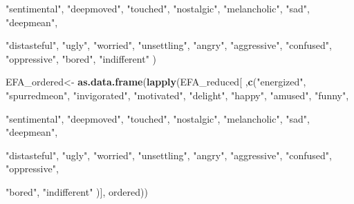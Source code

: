 \documentclass[
]{article}
\newenvironment{Shaded}{\begin{snugshade}}{\end{snugshade}}
\newcommand{\KeywordTok}[1]{\textcolor[rgb]{0.13,0.29,0.53}{\textbf{#1}}}
\newcommand{\NormalTok}[1]{#1}
\newcommand{\StringTok}[1]{\textcolor[rgb]{0.31,0.60,0.02}{#1}}
\begin{document}
\begin{Shaded}
\begin{Highlighting}[]
                    \StringTok{"sentimental"}\NormalTok{,}
                    \StringTok{"deepmoved"}\NormalTok{,}
                    \StringTok{"touched"}\NormalTok{,}
                    \StringTok{"nostalgic"}\NormalTok{,}
                    \StringTok{"melancholic"}\NormalTok{,}
                    \StringTok{"sad"}\NormalTok{,}
                    \StringTok{"deepmean"}\NormalTok{,}
                    
                    \StringTok{"distasteful"}\NormalTok{,}
                    \StringTok{"ugly"}\NormalTok{,}
                    \StringTok{"worried"}\NormalTok{,}
                    \StringTok{"unsettling"}\NormalTok{,}
                    \StringTok{"angry"}\NormalTok{,}
                    \StringTok{"aggressive"}\NormalTok{,}
                    \StringTok{"confused"}\NormalTok{,}
                    \StringTok{"oppressive"}\NormalTok{,}
                    \StringTok{"bored"}\NormalTok{,}
                    \StringTok{"indifferent"}
\NormalTok{                    )}


\NormalTok{ EFA\_ordered\textless{}{-}}\StringTok{ }\KeywordTok{as.data.frame}\NormalTok{(}\KeywordTok{lapply}\NormalTok{(EFA\_reduced[}
\NormalTok{   ,}\KeywordTok{c}\NormalTok{(}\StringTok{"energized"}\NormalTok{,}
      \StringTok{"spurredmeon"}\NormalTok{,}
      \StringTok{"invigorated"}\NormalTok{,}
      \StringTok{"motivated"}\NormalTok{,}
      \StringTok{"delight"}\NormalTok{,}
      \StringTok{"happy"}\NormalTok{,}
      \StringTok{"amused"}\NormalTok{,}
      \StringTok{"funny"}\NormalTok{,}
      
      \StringTok{"sentimental"}\NormalTok{,}
      \StringTok{"deepmoved"}\NormalTok{,}
      \StringTok{"touched"}\NormalTok{,}
      \StringTok{"nostalgic"}\NormalTok{,}
      \StringTok{"melancholic"}\NormalTok{,}
      \StringTok{"sad"}\NormalTok{,}
      \StringTok{"deepmean"}\NormalTok{,}
      
      \StringTok{"distasteful"}\NormalTok{,}
      \StringTok{"ugly"}\NormalTok{,}
      \StringTok{"worried"}\NormalTok{,}
      \StringTok{"unsettling"}\NormalTok{,}
      \StringTok{"angry"}\NormalTok{,}
      \StringTok{"aggressive"}\NormalTok{,}
      \StringTok{"confused"}\NormalTok{,}
      \StringTok{"oppressive"}\NormalTok{,}
      
      \StringTok{"bored"}\NormalTok{,}
      \StringTok{"indifferent"}
\NormalTok{                  )],}
\NormalTok{         ordered))}
\end{Highlighting}
\end{Shaded}
\end{document}

